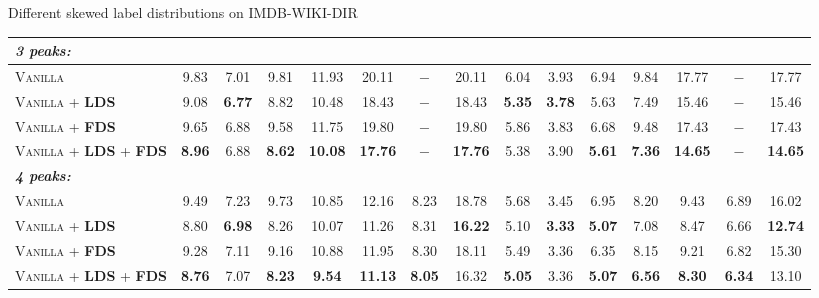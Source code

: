 \begin{frame}{Different skewed label distributions on IMDB-WIKI-DIR}
\begin{table}[t]
\begin{center}
{\begin{tabular}{l|ccccccc|ccccccc}
					\multicolumn{9}{l}{\emph{\textbf{3 peaks:}}} \\ \midrule
					\textsc{Vanilla}      & 9.83  & 7.01 & 9.81 & 11.93 & 20.11 & $-$ & 20.11 & 6.04 & 3.93 & 6.94 & 9.84 & 17.77 & $-$ & 17.77 \\ [1.2pt]
					\textsc{Vanilla} + \textbf{\textsc{LDS}} & 9.08 & \textbf{6.77} & 8.82 & 10.48 & 18.43 & $-$ & 18.43 & \textbf{5.35} & \textbf{3.78} & 5.63 & 7.49 & 15.46 & $-$ & 15.46 \\[1.2pt]
					\textsc{Vanilla} + \textbf{\textsc{FDS}} & 9.65 & 6.88 & 9.58 & 11.75 & 19.80 & $-$ & 19.80 & 5.86 & 3.83 & 6.68 & 9.48 & 17.43 & $-$ & 17.43 \\[1.2pt]
					\textsc{Vanilla} + \textbf{\textsc{LDS}} + \textbf{\textsc{FDS}} & \textbf{8.96} & 6.88 & \textbf{8.62} & \textbf{10.08} & \textbf{17.76} & $-$ & \textbf{17.76} & 5.38  & 3.90 & \textbf{5.61} & \textbf{7.36} & \textbf{14.65} & $-$ & \textbf{14.65}  \\ \midrule\midrule
					\multicolumn{9}{l}{\emph{\textbf{4 peaks:}}} \\ \midrule
					\textsc{Vanilla}      & 9.49 & 7.23 & 9.73 & 10.85 & 12.16 & 8.23 & 18.78 & 5.68 & 3.45 & 6.95 & 8.20 & 9.43 & 6.89 & 16.02 \\ [1.2pt]
					\textsc{Vanilla} + \textbf{\textsc{LDS}} & 8.80 & \textbf{6.98} & 8.26 & 10.07 & 11.26 & 8.31 & \textbf{16.22} & 5.10 & \textbf{3.33} & \textbf{5.07} & 7.08 & 8.47 & 6.66 & \textbf{12.74} \\[1.2pt]
					\textsc{Vanilla} + \textbf{\textsc{FDS}} & 9.28 & 7.11 & 9.16 & 10.88 & 11.95 & 8.30 & 18.11 & 5.49 & 3.36 & 6.35 & 8.15 & 9.21 & 6.82 & 15.30 \\[1.2pt]
					\textsc{Vanilla} + \textbf{\textsc{LDS}} + \textbf{\textsc{FDS}} & \textbf{8.76} & 7.07 & \textbf{8.23} & \textbf{9.54} & \textbf{11.13} & \textbf{8.05} & 16.32 & \textbf{5.05} & 3.36 & \textbf{5.07} & \textbf{6.56} & \textbf{8.30} & \textbf{6.34} & 13.10  \\ 
					\bottomrule[1.5pt]
				\end{tabular}
			}
		\end{center}
	\end{table}
\end{frame}
